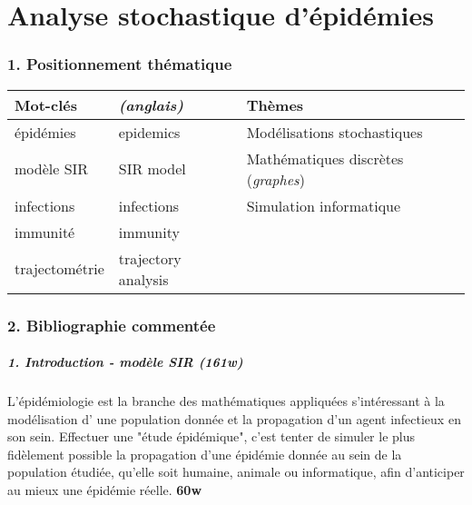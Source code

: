 \documentclass{article}
\begin{document}
\part*{Analyse stochastique d'épidémies}

\section*{1. Positionnement thématique}

\begin{tabular}{ | l | l | l | }
 Mot-clés        &  \textit{(anglais)}          &  Thèmes                              \\
\hline

 épidémies       &  epidemics            &  Modélisations stochastiques         \\

 modèle SIR      &  SIR model            &  Mathématiques discrètes (\textit{graphes}) \\

 infections      &  infections           &  Simulation informatique             \\

 immunité        &  immunity             &                                      \\

 trajectométrie  &  trajectory analysis  &                                      \\

\end{tabular}

\section*{2. Bibliographie commentée}

\subsubsection*{1. Introduction - modèle SIR (\textit{161w})}

L'épidémiologie est la branche des mathématiques appliquées s'intéressant à la modélisation d' une population donnée et la propagation d'un agent infectieux en son sein. Effectuer une "étude épidémique", c'est tenter de simuler le plus fidèlement possible la propagation d'une épidémie donnée au sein de la population étudiée, qu'elle soit humaine, animale ou informatique, afin d'anticiper au mieux une épidémie réelle. \textbf{60w}
\end{document}
